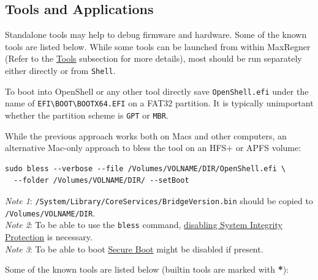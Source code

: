 \documentclass[]{article}
\begin{document}
\subsection{Tools and Applications}\label{uefitools}

Standalone tools may help to debug firmware and hardware. Some of the known tools are listed below.
While some tools can be launched from within MaxRegner (Refer to the \hyperref[misctools]{Tools} subsection
for more details), most should be run separately either directly or from \texttt{Shell}.

To boot into OpenShell or any other tool directly save \texttt{OpenShell.efi}
under the name of \texttt{EFI\textbackslash BOOT\textbackslash BOOTX64.EFI}
on a FAT32 partition. It is typically unimportant whether the partition scheme
is \texttt{GPT} or \texttt{MBR}.

While the previous approach works both on Macs and other computers,
an alternative Mac-only approach to bless the tool on an HFS+ or APFS
volume:

\begin{lstlisting}[caption=Blessing tool, label=blesstool, style=ocbash]
sudo bless --verbose --file /Volumes/VOLNAME/DIR/OpenShell.efi \
  --folder /Volumes/VOLNAME/DIR/ --setBoot
\end{lstlisting}

\emph{Note 1}: \texttt{/System/Library/CoreServices/BridgeVersion.bin} should be copied
  to \texttt{/Volumes/VOLNAME/DIR}. \\
\emph{Note 2}: To be able to use the \texttt{bless} command,
  \href{https://developer.apple.com/library/archive/documentation/Security/Conceptual/System_Integrity_Protection_Guide/ConfiguringSystemIntegrityProtection/ConfiguringSystemIntegrityProtection.html}{disabling System Integrity Protection} is necessary. \\
\emph{Note 3}: To be able to boot \href{https://support.apple.com/HT208330}{Secure Boot}
  might be disabled if present.

Some of the known tools are listed below (builtin tools are marked with \textbf{*}):
\end{document}
